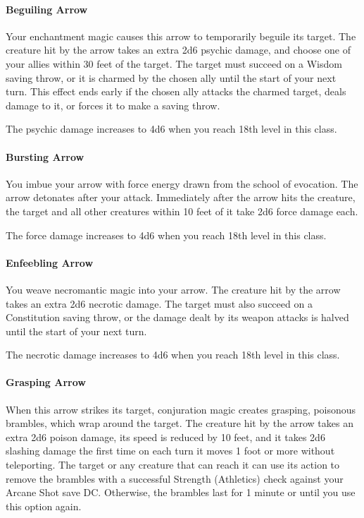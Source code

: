 \documentclass[letterpaper,openany,oneside,twocolumn]{book}
\begin{document}
\paragraph{Beguiling Arrow} Your enchantment magic causes this arrow to temporarily beguile its target. The creature hit by the arrow takes an extra 2d6 psychic damage, and choose one of your allies within 30 feet of the target. The target must succeed on a Wisdom saving throw, or it is charmed by the chosen ally until the start of your next turn. This effect ends early if the chosen ally attacks the charmed target, deals damage to it, or forces it to make a saving throw.

The psychic damage increases to 4d6 when you reach 18th level in this class.

\paragraph{Bursting Arrow} You imbue your arrow with force energy drawn from the school of evocation. The arrow detonates after your attack. Immediately after the arrow hits the creature, the target and all other creatures within 10 feet of it take 2d6 force damage each.

The force damage increases to 4d6 when you reach 18th level in this class.

\paragraph{Enfeebling Arrow} You weave necromantic magic into your arrow. The creature hit by the arrow takes an extra 2d6 necrotic damage. The target must also succeed on a Constitution saving throw, or the damage dealt by its weapon attacks is halved until the start of your next turn.

The necrotic damage increases to 4d6 when you reach 18th level in this class.

\paragraph{Grasping Arrow} When this arrow strikes its target, conjuration magic creates grasping, poisonous brambles, which wrap around the target. The creature hit by the arrow takes an extra 2d6 poison damage, its speed is reduced by 10 feet, and it takes 2d6 slashing damage the first time on each turn it moves 1 foot or more without teleporting. The target or any creature that can reach it can use its action to remove the brambles with a successful Strength (Athletics) check against your Arcane Shot save DC. Otherwise, the brambles last for 1 minute or until you use this option again.
\end{document}
